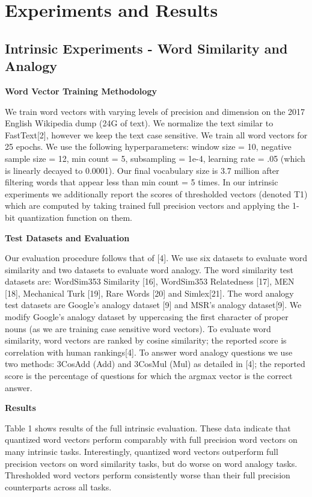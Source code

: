 \documentclass{article} %
\begin{document}
\section{Experiments and Results}
\subsection{Intrinsic Experiments - Word Similarity and Analogy}

\textbf{Word Vector Training Methodology}

We train word vectors with varying levels of precision and dimension
on the 2017 English Wikipedia dump (24G of text). We normalize the
text similar to FastText[2], however we keep the text case
sensitive. We train all word vectors for 25 epochs. We use the
following hyperparameters: window size = 10, negative sample size =
12, min count = 5, subsampling = 1e-4, learning rate = .05 (which is
linearly decayed to 0.0001). Our final vocabulary size is 3.7 million
after filtering words that appear less than min count = 5 times. In
our intrinsic experiments we additionally report the scores of
thresholded vectors (denoted T1) which are computed by taking
trained full precision vectors and applying the 1-bit quantization function
on them.

\textbf{Test Datasets and Evaluation}

Our evaluation procedure follows that of [4]. We use six datasets to
evaluate word similarity and two datasets to evaluate word
analogy. The word similarity test datasets are: WordSim353 Similarity
[16], WordSim353 Relatedness [17], MEN [18], Mechanical Turk [19], Rare
Words [20] and Simlex[21]. The word analogy test datasets are Google's
analogy dataset [9] and MSR's analogy dataset[9]. We modify Google's
analogy dataset by uppercasing the first character of proper nouns (as
we are training case sensitive word vectors). To evaluate word
similarity, word vectors are ranked by cosine similarity; the reported
score is correlation with human rankings[4]. To answer word analogy
questions we use two methods: 3CosAdd (Add) and 3CosMul (Mul) as
detailed in [4]; the reported score is the percentage of questions for
which the argmax vector is the correct answer.

\textbf{Results}

Table 1 shows results of the full intrinsic evaluation. These data
indicate that quantized word vectors perform comparably with full
precision word vectors on many intrinsic tasks. Interestingly,
quantized word vectors outperform full precision vectors on word
similarity tasks, but do worse on word analogy tasks. Thresholded word
vectors perform consistently worse than their full precision
counterparts across all tasks.
\end{document}
